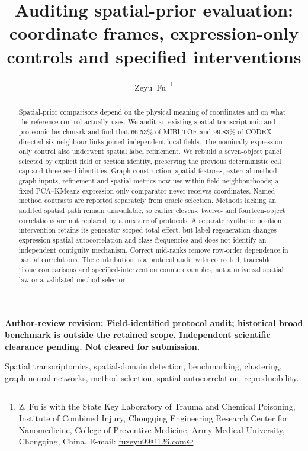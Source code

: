 \documentclass[journal]{IEEEtran}
\title{Auditing spatial-prior evaluation:\\
coordinate frames, expression-only controls and specified interventions}
\author{Zeyu~Fu\,\orcidlink{0009-0001-8329-0108}%
\thanks{Z. Fu is with the State Key Laboratory of Trauma and Chemical Poisoning, Institute of
Combined Injury, Chongqing Engineering Research Center for Nanomedicine, College of Preventive
Medicine, Army Medical University, Chongqing, China. E-mail:
\href{mailto:fuzeyu99@126.com}{fuzeyu99@126.com}}}
\begin{document}
\raggedbottom

\maketitle
\begin{center}\small\bfseries Author-review revision: Field-identified protocol audit; historical broad benchmark is outside the retained scope. Independent scientific clearance pending. Not cleared for submission.\end{center}

\begin{abstract}
Spatial-prior comparisons depend on the physical meaning of coordinates and on what the reference control actually uses. We audit an existing spatial-transcriptomic and proteomic benchmark and find that 66.53\% of MIBI-TOF and 99.83\% of CODEX directed six-neighbour links joined independent local fields. The nominally expression-only control also underwent spatial label refinement. We rebuild a seven-object panel selected by explicit field or section identity, preserving the previous deterministic cell cap and three seed identities. Graph construction, spatial features, external-method graph inputs, refinement and spatial metrics now use within-field neighbourhoods; a fixed PCA--KMeans expression-only comparator never receives coordinates. Named-method contrasts are reported separately from oracle selection. Methods lacking an audited spatial path remain unavailable, so earlier eleven-, twelve- and fourteen-object correlations are not replaced by a mixture of protocols. A separate synthetic position intervention retains its generator-scoped total effect, but label regeneration changes expression spatial autocorrelation and class frequencies and does not identify an independent contiguity mechanism. Correct mid-ranks remove row-order dependence in partial correlations. The contribution is a protocol audit with corrected, traceable tissue comparisons and specified-intervention counterexamples, not a universal spatial law or a validated method selector.
\end{abstract}

\begin{IEEEkeywords}
Spatial transcriptomics, spatial-domain detection, benchmarking, clustering, graph neural networks, method
selection, spatial autocorrelation, reproducibility.
\end{IEEEkeywords}

\IEEEpeerreviewmaketitle
\end{document}
